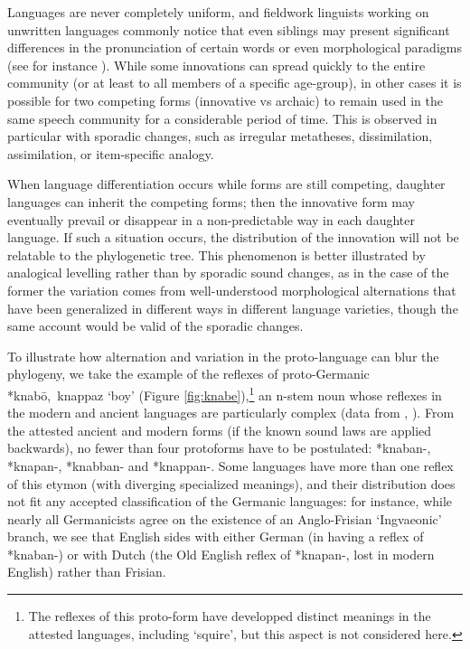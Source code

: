 \documentclass[svgnames,12pt]{scrartcl}
\newcommand{\ipa}[1]{{{\phon\mbox{#1}}}}
\begin{document}
{{Languages are never completely uniform, and fieldwork linguists working on unwritten languages
commonly notice that even siblings may present significant differences in the pronunciation of
certain words or even morphological paradigms (see for instance \citealt[29-30]{genetti07grammar}).
While some innovations can spread quickly to the entire community (or at least to all members of a
specific age-group), in other cases it is possible for two competing forms (innovative vs archaic)
to remain used in the same  speech community for a considerable period of time. This is observed in
particular with sporadic changes, such as irregular metatheses, dissimilation, assimilation, or
item-specific analogy.

When language differentiation occurs while forms are still competing, daughter languages can inherit
the competing forms; then the innovative form may eventually prevail or disappear in a
non-predictable way in each daughter language. If such a situation occurs, the distribution of the
innovation will not be relatable to the phylogenetic tree.  This phenomenon is better illustrated by
analogical levelling rather than by sporadic sound changes, as in the case of the former the
variation comes from well-understood morphological alternations that have been generalized in
different ways in different language varieties, though the same account  would be valid of the
sporadic changes.
 
To illustrate how alternation and variation in the proto-language can blur the phylogeny, we take the example of the reflexes of proto-Germanic *\ipa{knabō, knappaz} `boy' (Figure \ref{fig:knabe}),\footnote{The reflexes of this proto-form have developped distinct meanings in the attested languages, including `squire', but this aspect is not considered here.} an n-stem noun whose reflexes in the modern and ancient languages are particularly complex (data from \citealt[71,128]{kroonen11nstems}, \citealt[294]{kroonen13dict}).
From the attested ancient and modern forms (if the known sound laws are applied backwards), no fewer than four protoforms have to be postulated:  \ipa{*knaban-}, \ipa{*knapan-}, \ipa{*knabban-} and \ipa{*knappan-}. Some languages have more than one reflex of this etymon (with diverging specialized meanings), and their distribution does not fit any accepted classification of the Germanic languages: for instance, while nearly all Germanicists agree on the existence of an Anglo-Frisian `Ingvaeonic' branch, we see that English sides with either German (in having a reflex of \ipa{*knaban-}) or with Dutch (the Old English reflex of \ipa{*knapan-}, lost in modern English) rather than Frisian.

}}
\end{document}
